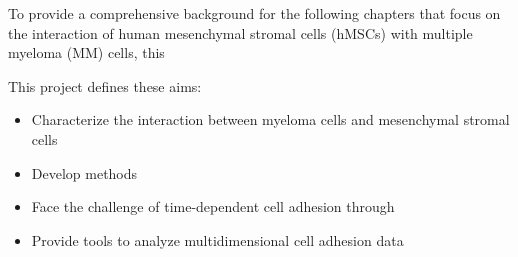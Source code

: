 \documentclass[12pt]{doctoral_thesis_uniwue}
\begin{document}





\newpage


\setcounter{page}{1} %



\newpage



\newpage


{\footnotesize \tableofcontents}
\newpage





\setcounter{page}{1} %

To provide a comprehensive background for the following chapters that focus on
the interaction of human mesenchymal stromal cells (hMSCs) with multiple myeloma
(MM) cells, this





\newpage


This project defines these aims:


\begin{itemize}
    \item Characterize the interaction between myeloma cells and mesenchymal stromal cells
    \item Develop methods
    \item Face the challenge of time-dependent cell adhesion through 
    \item Provide tools to analyze multidimensional cell adhesion data

\end{itemize}
\end{document}
